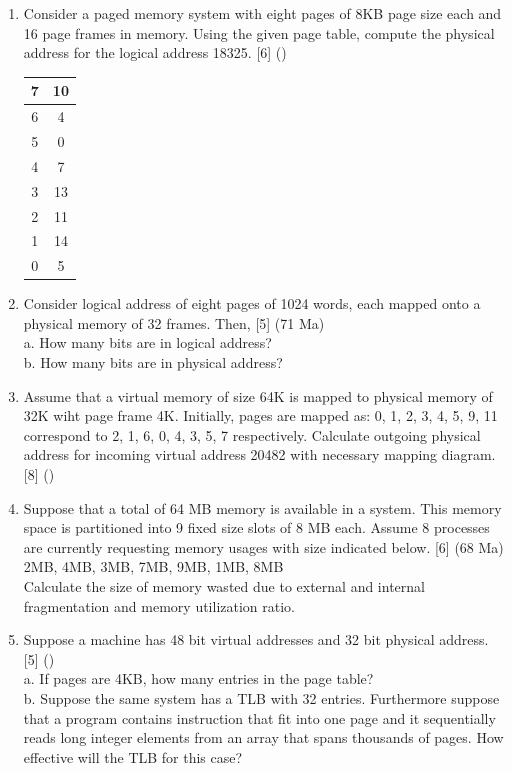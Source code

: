 \documentclass[12pt]{article}
\begin{document}
\begin{enumerate}
			\item Consider a paged memory system with eight pages of 8KB page size each and 16 page frames in memory. Using the given page table, compute the physical address for the logical address 18325. \hfill [6] ()\\
			\begin{tabular}{|c|c|}
				\hline
				7 & 10 \\ \hline
				6 & 4 \\ \hline
				5 & 0 \\ \hline
				4 & 7 \\ \hline
				3 & 13 \\ \hline
				2 & 11 \\ \hline
				1 & 14 \\ \hline
				0 & 5 \\ \hline
			\end{tabular}

			\item Consider logical address of eight pages of 1024 words, each mapped onto a physical memory of 32 frames. Then, \hfill [5] (71 Ma)\\
			a. How many bits are in logical address?\\
			b. How many bits are in physical address?

			\item Assume that a virtual memory of size 64K is mapped to physical memory of 32K wiht page frame 4K. Initially, pages are mapped as: 0, 1, 2, 3, 4, 5, 9, 11 correspond to 2, 1, 6, 0, 4, 3, 5, 7 respectively. Calculate outgoing physical address for incoming virtual address 20482 with necessary mapping diagram. \hfill [8] ()

			\item Suppose that a total of 64 MB memory is available in a system. This memory space is partitioned into 9 fixed size slots of 8 MB each. Assume 8 processes are currently requesting memory usages with size indicated below. \hfill [6] (68 Ma)\\
			2MB, 4MB, 3MB, 7MB, 9MB, 1MB, 8MB\\
			Calculate the size of memory wasted due to external and internal fragmentation and memory utilization ratio.

			\item Suppose a machine has 48 bit virtual addresses and 32 bit physical address. \hfill [5] ()\\
			a. If pages are 4KB, how many entries in the page table?\\
			b. Suppose the same system has a TLB with 32 entries. Furthermore suppose that a program contains instruction that fit into one page and it sequentially reads long integer elements from an array that spans thousands of pages. How effective will the TLB for this case?
		\end{enumerate}
\end{document}
